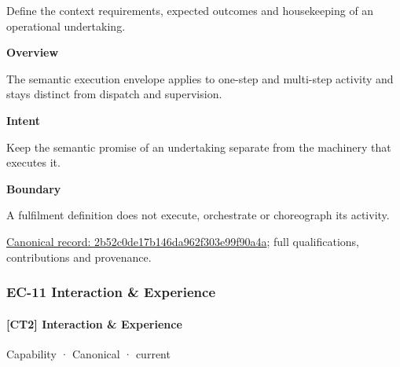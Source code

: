 Define the context requirements, expected outcomes and housekeeping of an operational undertaking.



\textbf{Overview}



The semantic execution envelope applies to one-step and multi-step activity and stays distinct from dispatch and supervision.



\textbf{Intent}



Keep the semantic promise of an undertaking separate from the machinery that executes it.



\textbf{Boundary}



A fulfilment definition does not execute, orchestrate or choreograph its activity.


{\footnotesize \href{../../../../continuum/strategy/capability/2b52c0de17b146da962f303e99f90a4a.md}{Canonical record: 2b52c0de17b146da962f303e99f90a4a}; full qualifications, contributions and provenance.}\par
\subsubsection{EC-11 Interaction \& Experience}

\paragraph{[CT2] Interaction \& Experience}

\label{element:4ec9757b1c6947b4b70b0f1159b760d3}
{\small Capability · Canonical · current}\par

